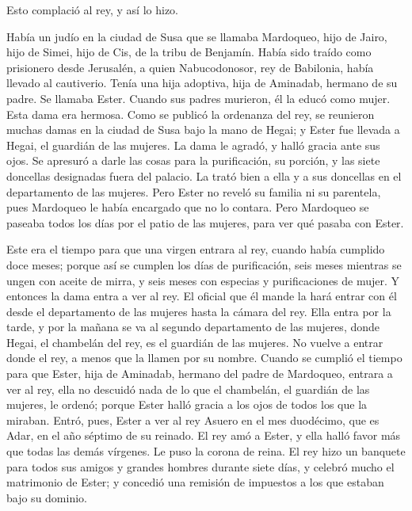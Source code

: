 Esto complació al rey, y así lo hizo.

 Había un judío en la ciudad de Susa que se llamaba
Mardoqueo, hijo de Jairo, hijo de Simei, hijo de Cis, de la tribu de
Benjamín.  Había sido traído como prisionero desde
Jerusalén, a quien Nabucodonosor, rey de Babilonia, había llevado al
cautiverio.  Tenía una hija adoptiva, hija de Aminadab,
hermano de su padre. Se llamaba Ester. Cuando sus padres murieron, él la
educó como mujer. Esta dama era hermosa.  Como se publicó
la ordenanza del rey, se reunieron muchas damas en la ciudad de Susa
bajo la mano de Hegai; y Ester fue llevada a Hegai, el guardián de las
mujeres.  La dama le agradó, y halló gracia ante sus ojos.
Se apresuró a darle las cosas para la purificación, su porción, y las
siete doncellas designadas fuera del palacio. La trató bien a ella y a
sus doncellas en el departamento de las mujeres.  Pero
Ester no reveló su familia ni su parentela, pues Mardoqueo le había
encargado que no lo contara.  Pero Mardoqueo se paseaba
todos los días por el patio de las mujeres, para ver qué pasaba con
Ester.

 Este era el tiempo para que una virgen entrara al rey,
cuando había cumplido doce meses; porque así se cumplen los días de
purificación, seis meses mientras se ungen con aceite de mirra, y seis
meses con especias y purificaciones de mujer.  Y entonces
la dama entra a ver al rey. El oficial que él mande la hará entrar con
él desde el departamento de las mujeres hasta la cámara del rey.
 Ella entra por la tarde, y por la mañana se va al
segundo departamento de las mujeres, donde Hegai, el chambelán del rey,
es el guardián de las mujeres. No vuelve a entrar donde el rey, a menos
que la llamen por su nombre.  Cuando se cumplió el tiempo
para que Ester, hija de Aminadab, hermano del padre de Mardoqueo,
entrara a ver al rey, ella no descuidó nada de lo que el chambelán, el
guardián de las mujeres, le ordenó; porque Ester halló gracia a los ojos
de todos los que la miraban.  Entró, pues, Ester a ver al
rey Asuero en el mes duodécimo, que es Adar, en el año séptimo de su
reinado.  El rey amó a Ester, y ella halló favor más que
todas las demás vírgenes. Le puso la corona de reina.  El
rey hizo un banquete para todos sus amigos y grandes hombres durante
siete días, y celebró mucho el matrimonio de Ester; y concedió una
remisión de impuestos a los que estaban bajo su dominio.

